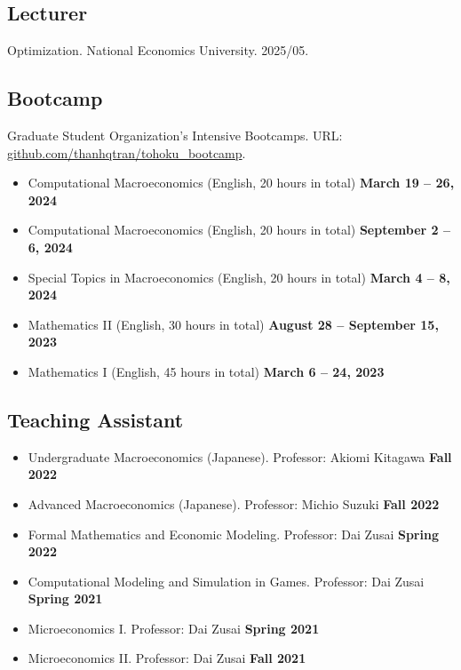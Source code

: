 \documentclass[12pt]{article}
\begin{document}
\subsection{Lecturer}
Optimization. National Economics University. 2025/05.

\subsection{Bootcamp}
Graduate Student Organization's Intensive Bootcamps. URL: \href{https://github.com/thanhqtran/tohoku_bootcamp}{github.com/thanhqtran/tohoku\_bootcamp}.
\begin{itemize}
	\item[ ] Computational Macroeconomics (English, 20 hours in total) \hfill {\bf March 19 -- 26, 2024}
	\item[ ] Computational Macroeconomics  (English, 20 hours in total) \hfill {\bf September 2 -- 6, 2024}
	\item[ ] Special Topics in Macroeconomics (English, 20 hours in total) \hfill {\bf March 4 -- 8, 2024}
	\item[ ] Mathematics II (English, 30 hours in total)  \hfill {\bf August 28 -- September 15, 2023}
	\item[ ] Mathematics I  (English, 45 hours in total)  \hfill {\bf March 6 -- 24, 2023}
\end{itemize}

\subsection{Teaching Assistant}
\begin{itemize}
	\item[ ] Undergraduate Macroeconomics (Japanese). Professor: Akiomi Kitagawa \hfill {\bf Fall 2022}
 	\item[ ] Advanced Macroeconomics (Japanese). Professor: Michio Suzuki \hfill {\bf Fall 2022}
  	\item[ ] Formal Mathematics and Economic Modeling. Professor: Dai Zusai \hfill {\bf Spring 2022}
   	\item[ ] Computational Modeling and Simulation in Games. Professor: Dai Zusai \hfill {\bf Spring 2021}
    	\item[ ] Microeconomics I. Professor: Dai Zusai \hfill {\bf Spring 2021}
     	\item[ ] Microeconomics II. Professor: Dai Zusai \hfill {\bf Fall 2021}
\end{itemize}
\end{document}
